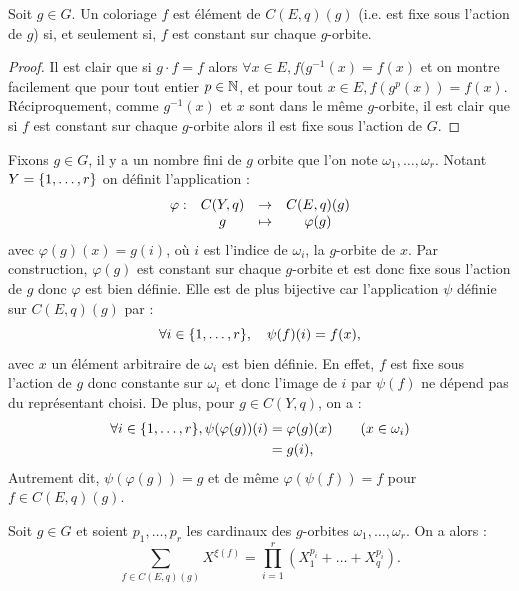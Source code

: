 \begin{lem}
\label{lem:3}
Soit $g \in G$. Un coloriage $f$ est élément de $C(E,q)(g)$ (i.e. est fixe sous l'action de $g$) si, et seulement si, $f$ est constant sur 
chaque $g$-orbite.
\end{lem}

\begin{proof}
Il est clair que si $g \cdot f = f$ alors $\forall x \in E, f(g^{-1}(x) = f(x)$ et on montre facilement que pour tout entier $p \in \mathbb{N}$,
et pour tout $x \in E, f(g^p(x)) = f(x)$. \\
Réciproquement, comme $g^{-1}(x)$ et $x$ sont dans le même $g$-orbite, il est clair que si $f$ est constant sur chaque $g$-orbite
alors il est fixe sous l'action de $G$.
\end{proof}

\begin{nota}
Fixons $g \in G$, il y a un nombre fini de $g$ orbite que l'on note $\omega_1, \dots, \omega_r$. 
Notant $Y= \{ 1, \dots, r \}$ on définit l'application :
\[ \begin{array}{c c c c}
\varphi : & C(Y,q) & \to & C(E,q)(g) \\
& g & \mapsto & \varphi(g) 
\end{array} \]
avec $\varphi(g)(x) = g(i)$, où $i$ est l'indice de $\omega_i$, la $g$-orbite de $x$. 
Par construction, $\varphi(g)$ est constant sur chaque $g$-orbite et est donc fixe sous l'action de $g$ donc $\varphi$ est bien définie.
Elle est de plus bijective car l'application $\psi$ définie sur $C(E,q)(g)$ par :
\[ \forall i \in \{ 1, \dots, r \}, \quad  \psi(f)(i) = f(x) , \]
avec $x$ un élément arbitraire de $\omega_i$ est bien définie. En effet, $f$ est fixe sous l'action de $g$ donc constante sur $\omega_i$
et donc l'image de $i$ par $\psi(f)$ ne dépend pas du représentant choisi. De plus, pour $g \in C(Y,q)$, on a :
\begin{align*}
\forall i \in \{ 1, \dots, r \}, \psi(\varphi(g))(i) & = \varphi(g)(x) \qquad (x \in \omega_i) \\
& = g(i) ,
\end{align*}
Autrement dit, $\psi(\varphi(g)) = g$ et de même $\varphi(\psi(f)) = f$ pour $f \in C(E,q)(g)$.
\end{nota}

\begin{lem}
\label{lem:4}
Soit $g \in G$ et soient $p_1, \dots, p_r$ les cardinaux des $g$-orbites $\omega_1, \dots, \omega_r$.  On a alors :
\[ \sum_{f \in C(E,q)(g)} X^{\xi(f)} = \prod_{i=1}^r(X_1^{p_i}+\dots+X_q^{p_i}) . \]
\end{lem}

